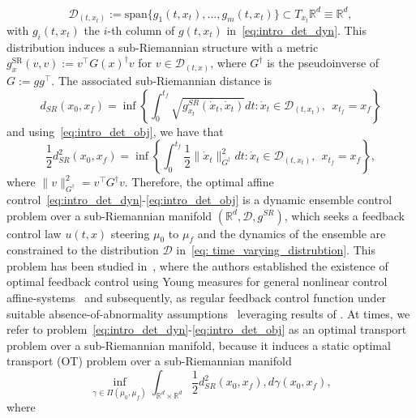 \documentclass{amsart}
\numberwithin{equation}{section}
\newcommand{\R}{\mathbb{R}}
\begin{document}
\begin{equation}\label{eq: time_varying_distrubtion}
\mathcal D_{(t,x_t)}:=\mathrm{span}\{g_1(t,x_t),\dots,g_m(t,x_t)\}\subset T_{x_t}\R^d\equiv\R^d,    
\end{equation}
 with $g_i(t,x_t)$ the $i$-th column of $g(t,x_t)$ in~\eqref{eq:intro_det_dyn}. %
 This distribution induces a sub-Riemannian structure with a metric $g_x^{\text{SR}}(v,v) := v^\top G(x)^\dagger v$ for $v \in \mathcal{D}_{(t,x)}$, where $G^\dagger$ is the pseudoinverse of $G := g g^\top$. The associated sub-Riemannian distance is  
 \[
 d_{SR}(x_0, x_f) = \inf\left\{\int_0^{t_f} \sqrt{g^{SR}_{x_t}(\dot{x}_t, \dot{x}_t)} dt : \dot{x}_t \in \mathcal{D}_{(t,x_t)},~  ~  x_{t_f}=x_f\right\}
 \]
 and using~\eqref{eq:intro_det_obj}, we have that 
\begin{equation*}
\frac12d^2_{SR}(x_0, x_f)= \inf\left\{\int_0^{t_f} \frac12\|\dot{x}_t\|_{G^\dagger}^2 dt : \dot{x}_t \in \mathcal{D}_{(t,x_t)},~ ~  x_{t_f}=x_f\right\},
\end{equation*}
where $\|v\|_{G^\dagger}^2 = v^\top G^\dagger v$. Therefore, the optimal affine control~\eqref{eq:intro_det_dyn}-\eqref{eq:intro_det_obj} is a dynamic ensemble control problem over a sub-Riemannian manifold $(\R^d,\mathcal{D},g^{SR})$, which seeks a feedback control law $u(t,x)$ steering $\mu_0$ to $\mu_f$ and the dynamics of the ensemble are constrained to the distribution $\mathcal{D}$ in~\eqref{eq: time_varying_distrubtion}. This problem has been studied in~\cite{elamvazhuthi2023dynamical,elamvazhuthi2024benamou}, where the authors established the existence of optimal feedback control using Young measures for general nonlinear control affine-systems~\cite{elamvazhuthi2023dynamical} and subsequently, as regular feedback control function under suitable absence-of-abnormality assumptions~\cite{elamvazhuthi2024benamou} leveraging results of \cite{agrachev2009optimal,figalli2010mass}. At times, we refer to problem~\eqref{eq:intro_det_dyn}-\eqref{eq:intro_det_obj} as an optimal transport problem over a sub-Riemannian manifold, because it induces a static optimal transport (OT) problem over a sub-Riemannian manifold
\begin{equation}\label{eq:OT-static}
 \inf_{\gamma\in\Pi(\mu_0,\mu_f)} \int_{\mathbb{R}^d\times\mathbb{R}^d} \frac12d_{SR}^2(x_0, x_f) , d\gamma(x_0,x_f),
\end{equation}
where
\end{document}
